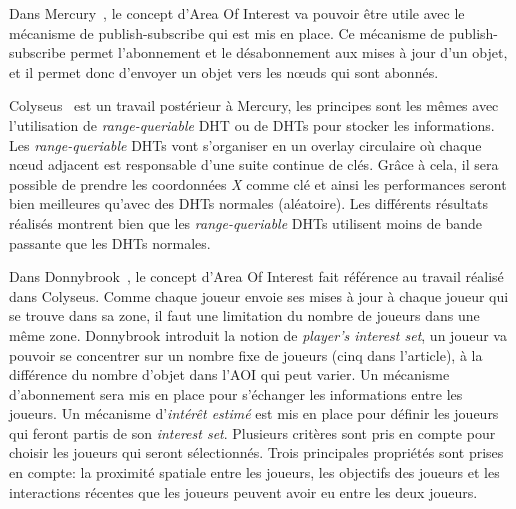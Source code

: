 	\par Dans Mercury~\cite{1015507}, le concept d'Area Of Interest va pouvoir être utile avec le mécanisme de publish-subscribe qui est mis en place. Ce mécanisme de publish-subscribe permet l'abonnement et le désabonnement aux mises à jour d'un objet, et il permet donc d'envoyer un objet vers les nœuds qui sont abonnés.\\
	\par Colyseus~\cite{1267692} est un travail postérieur à Mercury, les principes sont les mêmes avec l'utilisation de \textit{range-queriable} DHT ou de DHTs pour stocker les informations. Les \textit{range-queriable} DHTs vont s'organiser en un overlay circulaire où chaque nœud adjacent est responsable d'une suite continue de clés. Grâce à cela, il sera possible de prendre les coordonnées \textit{X} comme clé et ainsi les performances seront bien meilleures qu'avec des DHTs normales (aléatoire). Les différents résultats réalisés montrent bien que les \textit{range-queriable} DHTs utilisent moins de bande passante que les DHTs normales. \\
	\par Dans Donnybrook~\cite{1403002}, le concept d'Area Of Interest fait référence au travail réalisé dans Colyseus. Comme chaque joueur envoie ses mises à jour à chaque joueur qui se trouve dans sa zone, il faut une limitation du nombre de joueurs dans une même zone. Donnybrook introduit la notion de \textit{player's interest set}, un joueur va pouvoir se concentrer sur un nombre fixe de joueurs (cinq dans l'article), à la différence du nombre d'objet dans l'AOI qui peut varier. Un mécanisme d'abonnement sera mis en place pour s'échanger les informations entre les joueurs. Un mécanisme d'\textit{intérêt estimé} est mis en place pour définir les joueurs qui feront partis de son \textit{interest set}. Plusieurs critères sont pris en compte pour choisir les joueurs qui seront sélectionnés. Trois principales propriétés sont prises en compte: la proximité spatiale entre les joueurs, les objectifs des joueurs et les interactions récentes que les joueurs peuvent avoir eu entre les deux joueurs.\\
